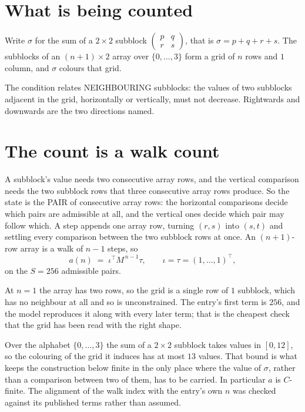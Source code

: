 \documentclass[11pt,a4paper]{article}
\theoremstyle{plain}
\theoremstyle{definition}
\begin{document}
\section{What is being counted}

Write $\sigma$ for the sum of a $2\times2$ subblock
$\begin{pmatrix}p&q\\r&s\end{pmatrix}$, that is $\sigma=p+q+r+s$. The subblocks of an
$(n+1)\times2$ array over $\{0,\dots,3\}$ form a grid of $n$ rows and $1$
column, and $\sigma$ colours that grid.

The condition relates NEIGHBOURING subblocks: the values of two subblocks adjacent in the grid,
horizontally or vertically, must not decrease. Rightwards and downwards are the two directions named.

\section{The count is a walk count}

A subblock's value needs two consecutive array rows, and the vertical
comparison needs the two subblock rows that three consecutive array rows produce. So the state
is the PAIR of consecutive array rows: the horizontal comparisons decide which pairs are
admissible at all, and the vertical ones decide which pair may follow which. A step appends one
array row, turning $(r,s)$ into $(s,t)$ and settling every comparison between the two subblock
rows at once. An $(n+1)$-row array is a walk of $n-1$ steps, so
\[
a(n)\;=\;\iota^{\!\top}M^{\,n-1}\tau,\qquad\iota=\tau=(1,\dots,1)^{\!\top},
\]
on the $S=256$ admissible pairs.

At $n=1$ the array has two rows, so the grid is a single row of $1$
subblock, which has no neighbour at all and so is unconstrained. The
entry's first term is $256$, and the model reproduces it along with every later term; that
is the cheapest check that the grid has been read with the right shape.

Over the alphabet $\{0,\dots,3\}$ the sum of a $2\times2$ subblock takes values in
$[0,12]$, so the colouring of the grid it induces has at most $13$ values.
That bound is what keeps the construction below finite in the only place where the value of
$\sigma$, rather than a comparison between two of them, has to be carried.
In particular $a$ is $C$-finite. The alignment of the walk index with the entry's own $n$ was
checked against its published terms rather than assumed.
\end{document}
